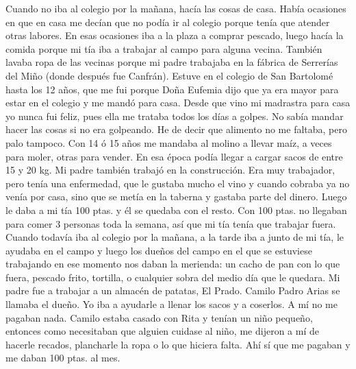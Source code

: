 \documentclass[12pt,a5paper]{book}
\begin{document}
Cuando no iba al colegio por la mañana, hacía las cosas de casa. Había ocasiones en que en casa me decían que no podía ir al colegio porque tenía que atender otras labores. En esas ocasiones iba a la plaza a comprar pescado, luego hacía la comida porque mi tía iba a trabajar al campo para alguna vecina. También lavaba ropa de las vecinas porque mi padre trabajaba en la fábrica de Serrerías del Miño (donde después fue Canfrán). 
Estuve en el colegio de San Bartolomé hasta los 12 años, que me fui porque Doña Eufemia dijo que ya era mayor para estar en el colegio y me mandó para casa.
Desde que vino mi madrastra para casa yo nunca fui feliz, pues ella me trataba todos los días a golpes. No sabía mandar hacer las cosas si no era golpeando. He de decir que alimento no me faltaba, pero palo tampoco.
Con 14 ó 15 años me mandaba al molino a llevar maíz, a veces para moler, otras para vender. En esa época podía llegar a cargar sacos de entre 15 y 20 kg.
Mi padre también trabajó en la construcción. Era muy trabajador, pero tenía una enfermedad, que le gustaba mucho el vino y cuando cobraba ya no venía por casa, sino que se metía en la taberna y gastaba parte del dinero. Luego le daba a mi tía 100 ptas. y él se quedaba con el resto.
Con 100 ptas. no llegaban para comer 3 personas toda la semana, así que mi tía tenía que trabajar fuera. Cuando todavía iba al colegio por la mañana, a la tarde iba a junto de mi tía, le ayudaba en el campo y luego los dueños del campo en el que se estuviese trabajando en ese momento nos daban la merienda: un cacho de pan con lo que fuera, pescado frito, tortilla, o cualquier sobra del medio día que le quedara.
Mi padre fue a trabajar a un almacén de patatas, El Prado. Camilo Padro Arias se llamaba el dueño. Yo iba a ayudarle a llenar los sacos y a coserlos. A mí no me pagaban nada. Camilo estaba casado con Rita y tenían un niño pequeño, entonces como necesitaban que alguien cuidase al niño, me dijeron a mí de hacerle recados, plancharle la ropa o lo que hiciera falta. Ahí sí que me pagaban y me daban 100 ptas. al mes.
\end{document}
